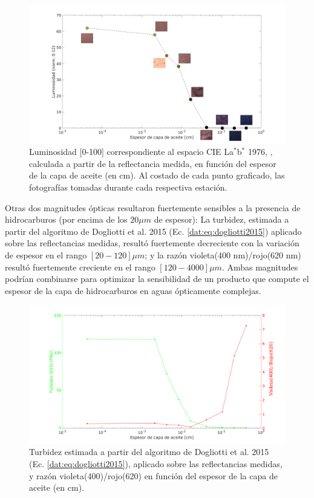         \begin{figure}
        \centering
        \includegraphics[width=\textwidth]{oil/figures/luminosidad}
        \caption[Luminosidad en función del espesor de la capa de aceite.]{Luminosidad [0-100] correspondiente al espacio CIE La$^{*}$b$^{*}$ 1976, \cite{cie2016}, calculada a partir de la reflectancia medida, en función del espesor de la capa de aceite (en cm). Al costado de cada punto graficado, las fotografías tomadas durante cada respectiva estación.}
        \label{oil:luminosidad}
        \end{figure}
    
        Otras dos magnitudes ópticas resultaron fuertemente sensibles a la presencia de hidrocarburos (por encima de los $20 \mu m$ de espesor): La turbidez, estimada a partir del algoritmo de Dogliotti et al. 2015 (Ec. \ref{dat:eq:dogliotti2015}) aplicado sobre las reflectancias medidas, resultó fuertemente decreciente con la variación de espesor en el rango $[20-120] \mu m$; y la razón violeta(400 nm)/rojo(620 nm) resultó fuertemente creciente en el rango $[120-4000] \mu m$. Ambas magnitudes podrían combinarse para optimizar la sensibilidad de un producto que compute el espesor de la capa de hidrocarburos en aguas ópticamente complejas.
    
        \begin{figure}
            \centering
            \includegraphics[width=\textwidth]{oil/figures/otrosIndices}
            \caption[Turbidez y razón violeta(400)/rojo(620) en función del espesor de la capa de aceite.]{Turbidez estimada a partir del algoritmo de Dogliotti et al. 2015 (Ec. \ref{dat:eq:dogliotti2015}), aplicado sobre las reflectancias medidas, y razón violeta(400)/rojo(620) en función del espesor de la capa de aceite (en cm).}
            \label{oil:otrosIndices}
        \end{figure}

